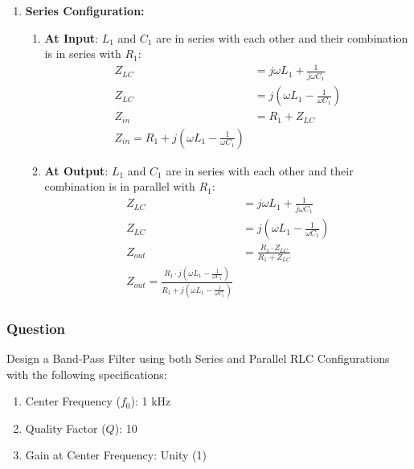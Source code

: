 \begin{enumerate}
\begin{enumerate}
\begin{enumerate}
\begin{align*}
            \end{align*}
        \end{enumerate}
      \item \textbf{Series Configuration:}
        \begin{enumerate}
          \item \textbf{At Input}:
            \(L_1\) and \(C_1\) are in series with each other and
            their combination is in series with \(R_1\):
            \begin{align*}
              Z_{LC} &= j \omega L_1 + \frac{1}{j \omega C_1} \\
              Z_{LC} &= j \left(\omega L_1 - \frac{1}{\omega C_1}\right) \\
              Z_{in} &= R_1 + Z_{LC} \\
              Z_{in} = R_1 + j \left(\omega L_1 - \frac{1}{\omega C_1}\right)
            \end{align*}
          \item \textbf{At Output}:
            \(L_1\) and \(C_1\) are in series with each other and
            their combination is in parallel with \(R_1\):
            \begin{align*}
              Z_{LC} &= j \omega L_1 + \frac{1}{j \omega C_1} \\
              Z_{LC} &= j \left(\omega L_1 - \frac{1}{\omega C_1}\right) \\
              Z_{out} &= \frac{R_1 \cdot Z_{LC}}{R_1 + Z_{LC}} \\
              Z_{out} = \frac{R_1 \cdot j \left(\omega L_1 - \frac{1}{\omega C_1}\right)}{R_1 + j \left(\omega L_1 - \frac{1}{\omega C_1}\right)}
            \end{align*}
          \end{enumerate}
    \end{enumerate}
\end{enumerate}

\subsubsection{Question}
Design a Band-Pass Filter using both Series and Parallel RLC
Configurations with the following specifications:
\begin{enumerate}
  \item Center Frequency (\(f_0\)): 1 kHz
  \item Quality Factor (\(Q\)): 10
  \item Gain at Center Frequency: Unity (1)
\end{enumerate}
